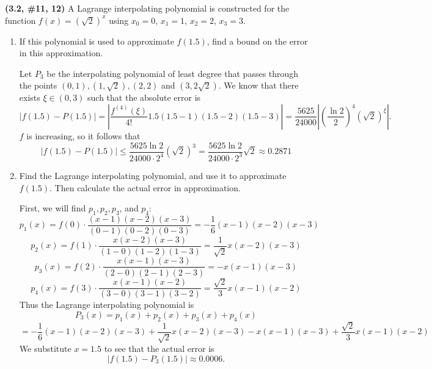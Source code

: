 \documentclass{eh-homework}
\begin{document}
    \newpage
    \begin{question}{6}
    \textbf{(3.2, \#11, 12)} A Lagrange interpolating polynomial is constructed for the function \(f(x) = (\sqrt{2})^x\) using \(x_0 = 0\), \(x_1 = 1\), \(x_2 = 2\), \(x_3 = 3\).
    
    \begin{enumerate}[label=\alph*.]
        \item If this polynomial is used to approximate \(f(1.5)\), find a bound on the error in this approximation.
        
        Let \(P_3\) be the interpolating polynomial of least degree that passes through the points \((0, 1), (1, \sqrt{2}), (2,2)\) and \((3, 2\sqrt{2})\). We know that there exists \(\xi \in (0,3)\) such that the absolute error is
        \[
            |f(1.5) - P(1.5)| = \left\vert \frac{f^{(4)}(\xi)}{4!} 1.5(1.5-1)(1.5-2)(1.5-3) \right\vert = \frac{5625}{24000}\left\vert \left(\frac{\ln 2}{2}\right)^4(\sqrt{2})^{\xi} \right\vert.
        \]
        \(f\) is increasing, so it follows that
        \[
            |f(1.5) - P(1.5)| \leq \frac{5625\ln 2}{24000 \cdot 2^4}(\sqrt{2})^3 = \frac{5625\ln 2}{24000 \cdot 2^3}\sqrt{2} \approx 0.2871
        \]
    
        \item Find the Lagrange interpolating polynomial, and use it to approximate \(f(1.5)\). Then calculate the actual error in approximation.
        
        First, we will find \(p_1, p_2, p_3\), and \(p_4\):
        \[
            p_1(x) = f(0)\cdot \frac{(x - 1)(x-2)(x-3)}{(0 - 1)(0 - 2)(0 - 3)} = -\frac{1}{6}(x-1)(x-2)(x-3)
        \]
        \[
            p_2(x) = f(1) \cdot \frac{x(x-2)(x-3)}{(1-0)(1-2)(1-3)} = \frac{1}{\sqrt{2}}x(x-2)(x-3)
        \]
        \[
            p_3(x) = f(2) \cdot \frac{x(x-1)(x-3)}{(2-0)(2-1)(2-3)} = -x(x-1)(x-3)
        \]
        \[
            p_4(x) = f(3) \cdot \frac{x(x-1)(x-2)}{(3-0)(3-1)(3-2)} = \frac{\sqrt{2}}{3}x(x-1)(x-2)
        \]
        Thus the Lagrange interpolating polynomial is
        \[
            P_3(x) = p_1(x) + p_2(x) + p_3(x) + p_4(x)
        \]
        \[
            = -\frac{1}{6}(x-1)(x-2)(x-3) + \frac{1}{\sqrt{2}}x(x-2)(x-3) - x(x-1)(x-3) + \frac{\sqrt{2}}{3}x(x-1)(x-2)
        \]
        We substitute \(x=1.5\) to see that the actual error is
        \[
            |f(1.5) - P_3(1.5)| \approx 0.0006.
        \]
    \end{enumerate}
    \end{question}
\end{document}
